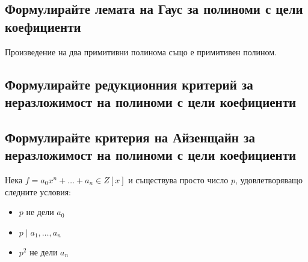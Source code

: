 \documentclass[10pt]{article}
\begin{document}
\subsection*{Формулирайте лемата на Гаус за полиноми с цели коефициенти}
Произведение на два примитивни полинома също е примитивен полином.

\subsection*{Формулирайте редукционния критерий за неразложимост на полиноми с цели коефициенти}


\subsection*{Формулирайте критерия на Айзенщайн за неразложимост на полиноми с цели коефициенти}
Нека $f = a_0x^n + \ldots + a_n \in Z[x]$ и съществува просто число $p$, удовлетворяващо следните условия:
\begin{itemize}
	\item $p$ не дели $a_0$
	\item $p \mid a_1, \ldots, a_n$
	\item $p^2$ не дели $a_n$
\end{itemize}
\end{document}
